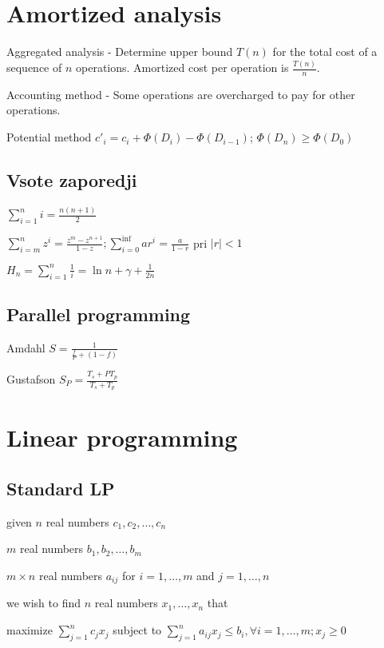 \documentclass[a4paper]{article}
\begin{document}
\begin{multicols*}{2}
{\section{Amortized analysis}
\begin{compactitem}
	\item Aggregated analysis -
	Determine upper bound $T(n)$ for the total cost of a sequence of $n$ operations.
	Amortized cost per operation is $\frac{T(n)}{n}$.
	\item Accounting method -
	Some operations are overcharged to pay for other operations.
	\item Potential method 
	$c'_i = c_i + \Phi(D_i) - \Phi({D_{i - 1}})$;
	$\Phi(D_n) \geq \Phi(D_0)$
\end{compactitem}

\subsection{Vsote zaporedji}
\begin{compactitem}
	\item $\sum_{i=1}^{n}i=\frac{n(n+1)}{2}$
	\item $\sum_{i=m}^{n}z^i=\frac{z^m-z^{n+1}}{1-z}; \sum_{i=0}^{\inf}ar^i = \frac{a}{1 - r}$ pri $|r| < 1$
	\item $H_n = \sum_{i=1}^{n}\frac{1}{i} = \ln n + \gamma + \frac{1}{2n}$
\end{compactitem}

\subsection{Parallel programming}

\begin{compactitem}
	\item Amdahl $S = \frac{1}{\frac{f}{P}+(1-f)}$
	\item Gustafson $S_P = \frac{T_s + P T_p}{T_s + T_p}$
\end{compactitem}

\section{Linear programming}
\subsection{Standard LP}
\begin{compactitem}
	\item given $n$ real numbers $c_1,c_2,\ldots,c_n$
	\item $m$ real numbers $b_1,b_2,\ldots,b_m$
	\item $m\times n$ real numbers $a_{ij}$ for $i=1,\ldots,m$ and $j=1,\ldots,n$
	\item we wish to find $n$ real numbers $x_1,\ldots,x_n$ that
\end{compactitem}
maximize $\sum_{j=1}^nc_jx_j$ subject to
$\sum_{j=1}^na_{ij}x_j\leq b_i, \forall i=1,\ldots,m; x_j\geq 0$

}
\end{multicols*}
\end{document}
